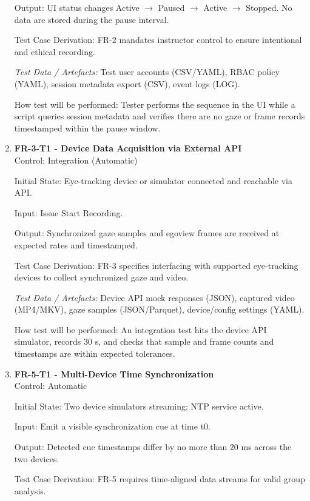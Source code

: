 \documentclass[12pt, titlepage]{article}
\begin{document}
\begin{enumerate}
Output: UI status changes Active $\rightarrow$ Paused $\rightarrow$ Active $\rightarrow$ Stopped. No data are stored during the pause interval.

Test Case Derivation: FR-2 mandates instructor control to ensure intentional and ethical recording.

\textit{Test Data / Artefacts:} Test user accounts (CSV/YAML), RBAC policy (YAML), session metadata export (CSV), event logs (LOG).

How test will be performed: Tester performs the sequence in the UI while a script queries session metadata and verifies there are no gaze or frame records timestamped within the pause window.

\item \textbf{FR-3-T1 - Device Data Acquisition via External API} \\

Control: Integration (Automatic)

Initial State: Eye-tracking device or simulator connected and reachable via API.

Input: Issue Start Recording.

Output: Synchronized gaze samples and egoview frames are received at expected rates and timestamped.

Test Case Derivation: FR-3 specifies interfacing with supported eye-tracking devices to collect synchronized gaze and video.

\textit{Test Data / Artefacts:} Device API mock responses (JSON), captured video (MP4/MKV), gaze samples (JSON/Parquet), device/config settings (YAML).

How test will be performed: An integration test hits the device API simulator, records 30 s, and checks that sample and frame counts and timestamps are within expected tolerances.

\item \textbf{FR-5-T1 - Multi-Device Time Synchronization} \\

Control: Automatic

Initial State: Two device simulators streaming; NTP service active.

Input: Emit a visible synchronization cue at time t0.

Output: Detected cue timestamps differ by no more than 20 ms across the two devices.

Test Case Derivation: FR-5 requires time-aligned data streams for valid group analysis.


\end{enumerate}
\end{document}
